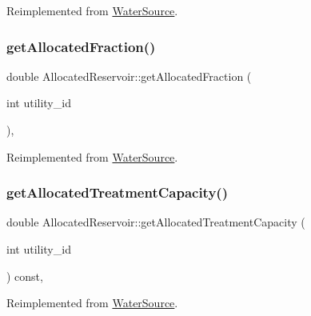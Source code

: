 Reimplemented from \mbox{\hyperlink{classWaterSource_a44102a0eafdaebd86f0ed8dabb313733}{Water\+Source}}.

\mbox{\label{classAllocatedReservoir_a731381982c9245b0bf24db4082dc74c1}} 
\subsubsection{\texorpdfstring{get\+Allocated\+Fraction()}{getAllocatedFraction()}}
{\footnotesize\ttfamily double Allocated\+Reservoir\+::get\+Allocated\+Fraction (\begin{DoxyParamCaption}\item[{int}]{utility\+\_\+id }\end{DoxyParamCaption})\hspace{0.3cm}{\ttfamily [override]}, {\ttfamily [virtual]}}



Reimplemented from \mbox{\hyperlink{classWaterSource_a1843ada21b8e7500d80a5a7db10621b3}{Water\+Source}}.

\mbox{\label{classAllocatedReservoir_aba81b93e1aa1154ce411248903fabde6}} 
\subsubsection{\texorpdfstring{get\+Allocated\+Treatment\+Capacity()}{getAllocatedTreatmentCapacity()}}
{\footnotesize\ttfamily double Allocated\+Reservoir\+::get\+Allocated\+Treatment\+Capacity (\begin{DoxyParamCaption}\item[{int}]{utility\+\_\+id }\end{DoxyParamCaption}) const\hspace{0.3cm}{\ttfamily [override]}, {\ttfamily [virtual]}}



Reimplemented from \mbox{\hyperlink{classWaterSource_ab3ba86d2a3e864e435ba2b88cceea555}{Water\+Source}}.

